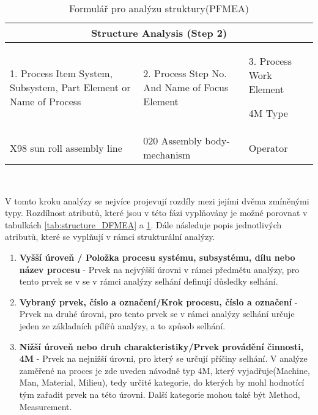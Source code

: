 \begin{center}
\begin{table}[h]
	\centering
	\caption{Formulář pro analýzu struktury(PFMEA) }
	\label{tab:structure_PFMEA}
\begin{tabular}{ |p{5cm}|p{5cm}|p{5cm}|  }
 \hline
 \multicolumn{3}{|c|}{Structure Analysis (Step 2)} \\
 \hline
1. Process Item
System, Subsystem, Part Element or Name of Process
& 2. Process Step
No. And Name of Focus Element
&3. Process Work Element

4M Type\\
 \hline
X98 sun roll assembly line   & 020 Assembly body-mechanism   &Operator\\


 \hline
\end{tabular}\  
\end{table}
\end{center}

V tomto kroku analýzy se nejvíce projevují rozdíly mezi jejími dvěma zmíněnými typy. Rozdílnost atributů, které jsou v této fázi vyplňovány je možné porovnat v tabulkách \ref{tab:structure_DFMEA} a  \ref{tab:structure_PFMEA}. 
Dále následuje popis jednotlivých atributů, které se vyplňují v rámci strukturální analýzy. 

\begin{enumerate}
	\item \textbf{Vyšší úroveň / Položka procesu systému, subsystému, dílu nebo název procesu} - Prvek na nejvýšší úrovni v rámci předmětu analýzy, pro tento prvek se v se v rámci analýzy selhání definují důsledky selhání.
	\item \textbf{Vybraný prvek, číslo a označení/Krok procesu, číslo a označení} - Prvek na druhé úrovni, pro tento prvek se v rámci analýzy selhání určuje jeden ze základních pílířů analýzy, a to způsob selhání.
	\item \textbf{Nižší úroveň nebo druh charakteristiky/Prvek provádění činnosti, 4M} - Prvek na nejnižší úrovni, pro který se určují příčiny selhání. V analýze zaměřené na proces je zde uveden návodně typ 4M, který vyjadřuje(Machine, Man, Material, Milieu), tedy určité kategorie, do kterých by mohl hodnotící tým zařadit prvek na této úrovni. Další kategorie mohou také být Method, Measurement.  
\end{enumerate}


